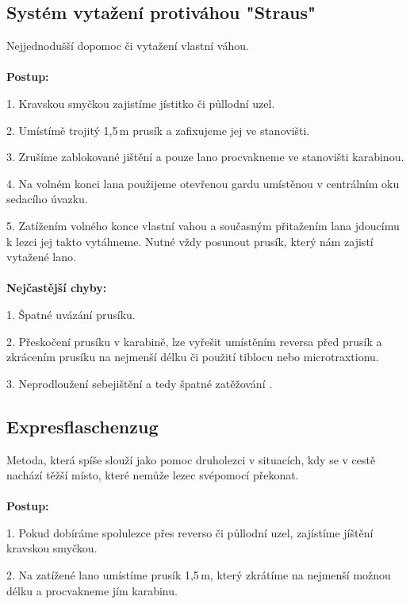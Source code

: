 \subsection{Systém vytažení protiváhou "Straus"}
\def\figurename{Obr.} %
\def\tablename{Tab.} %
\def\figureautorefname{obr.} %
\def\tableautorefname{tab.} %
\def\chapterautorefname{kapitola} %
Nejjednodušší dopomoc či vytažení vlastní váhou.
\\
\\
\textbf{Postup:}

1. Kravskou smyčkou zajistíme jístitko či půllodní uzel. 

2. Umístímě trojitý 1,5\,m prusík a zafixujeme jej ve stanovišti.

3. Zrušíme zablokované jištění a pouze lano procvakneme ve stanovišti karabinou.

4. Na volném konci lana použijeme otevřenou gardu umístěnou v centrálním oku sedacího úvazku.

5. Zatížením volného konce vlastní vahou a současným přitažením lana jdoucímu k lezci jej takto vytáhneme. Nutné vždy posunout prusík, který nám zajistí vytažené lano.
\\
\\
\textbf{Nejčastější chyby:}

1. Špatné uvázání prusíku.

2. Přeskočení prusíku v karabině, lze vyřešit umístěním reversa před prusík a zkrácením prusíku na nejmenší délku či použití tiblocu nebo microtraxtionu.

3. Neprodloužení sebejištění a tedy špatné zatěžování \cite{climbing_school_2022}.

\subsection{Expresflaschenzug}

Metoda, která spíše slouží jako pomoc druholezci v situacích, kdy se v cestě nachází těžší místo, které nemůže lezec svépomocí překonat. 
\\
\\
\textbf{Postup:}

1. Pokud dobíráme spolulezce přes reverso či půllodní uzel, zajístíme jíštění kravskou smyčkou. 

2. Na zatížené lano umístíme prusík 1,5\,m, který zkrátíme na nejmenší možnou délku a procvakneme jím karabinu.

